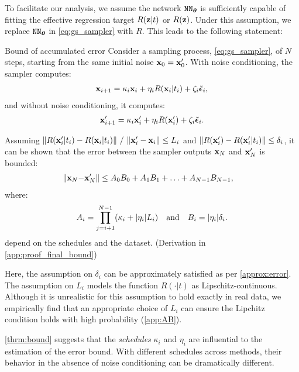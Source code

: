 To facilitate our analysis, we assume the network ${\texttt{NN}}_{{\bm{\theta}}}$ is sufficiently capable of fitting the effective regression target $R({\mathbf{z}}|t)$ or $R({\mathbf{z}})$. Under this assumption, we replace ${\texttt{NN}}_{{\bm{\theta}}}$ in \cref{eq:gs_sampler} with $R$. This leads to the following statement:




\begin{statement}{Bound of accumulated error}\label{thrm:bound}
Consider a sampling process, \cref{eq:gs_sampler}, of $N$ steps, starting from the same initial noise ${\mathbf{x}}_0={\mathbf{x}}_0'$. With noise conditioning, the sampler computes:
   \begin{align*}
    {\mathbf{x}}_{i+1} = \kappa_i {\mathbf{x}}_i + \eta_i R({\mathbf{x}}_i| t_i) + \zeta_i \tilde{{\bm{\epsilon}}}_i,
   \end{align*}
   and without noise conditioning, it computes:
   \begin{align*}
    {\mathbf{x}}_{i+1}' = \kappa_i {\mathbf{x}}_i' + \eta_i R({\mathbf{x}}_i') + \zeta_i \tilde{{\bm{\epsilon}}}_i.
   \end{align*}
   
Assuming ${\|R({\mathbf{x}}_i'|t_i)-R({\mathbf{x}}_i|t_i)\|}~/~{\|{\mathbf{x}}_i'-{\mathbf{x}}_i\|}\le L_i$ and $\|R({\mathbf{x}}_i')-R({\mathbf{x}}_i'| t_i)\|\le \delta_i$, it can be shown that the error between the sampler outputs ${\mathbf{x}}_N$ and ${\mathbf{x}}_N'$ is bounded: 
   \begin{align}\label{eq:bound}
    \|{\mathbf{x}}_N{-}{\mathbf{x}}_N'\| &\le A_0B_0+A_1B_1+\ldots+A_{N{-}1}B_{N{-}1},
   \end{align}
 \vspace{-1em} where:
   \begin{align*}
 \vspace{-1em}
 A_i = \prod_{j=i+1}^{N-1}(\kappa_i+|\eta_i|L_i) \quad\text{and}\quad B_i=|\eta_i|\delta_i.
   \end{align*}
   depend on the schedules and the dataset.
 (Derivation in \cref{app:proof_final_bound})
\end{statement}


Here, the assumption on $\delta_i$ can be approximately satisfied as per \cref{approx:error}.
The assumption on $L_i$ models the function $R(\cdot|t)$ as Lipschitz-continuous. Although it is unrealistic for this assumption to hold exactly in real data, we empirically find that an appropriate choice of $L_i$ can ensure the Lipchitz condition holds with high probability (\cref{app:AB}).


\cref{thrm:bound} suggests that the \textit{schedules} $\kappa_i$ and $\eta_i$ are influential to the estimation of the error bound. With different schedules across methods, their behavior in the absence of noise conditioning can be dramatically different.


